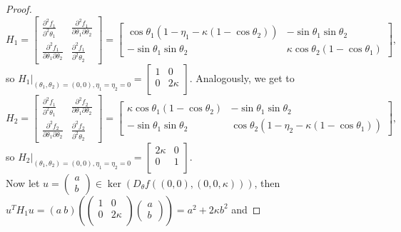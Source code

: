 \documentclass{article}
\theoremstyle{definition}
\begin{document}
\begin{refsection}
\begin{proof}
 $$
 H_1 = \begin{bmatrix}
\frac{\partial^2 f_1}{\partial^2 \theta_1} & \frac{\partial^2 f_1}{\partial \theta_1 \partial \theta_2}
\\ \frac{\partial^2 f_1}{\partial \theta_1 \partial \theta_2} & \frac{\partial^2 f_1}{\partial^2 \theta_2} 
 \end{bmatrix}
 =
\begin{bmatrix}
\cos\theta_1(1-\eta_1-\kappa(1-\cos\theta_2)) &  -\sin\theta_1\sin\theta_2 \\
 -\sin\theta_1\sin\theta_2 &\kappa\cos\theta_2(1-\cos\theta_1) 
 \end{bmatrix},$$ so $H_1|_{(\theta_1,\theta_2)=(0,0),\eta_1=\eta_2=0}=
 \begin{bmatrix}
     1 & 0 \\ 0 & 2\kappa \\
 \end{bmatrix}.$
 Analogously, we get to
 $$
 H_2 = \begin{bmatrix}
\frac{\partial^2 f_1}{\partial^2 \theta_1} & \frac{\partial^2 f_2}{\partial \theta_1 \partial \theta_2}
\\ \frac{\partial^2 f_2}{\partial \theta_1 \partial \theta_2} & \frac{\partial^2 f_2}{\partial^2 \theta_2} 
 \end{bmatrix}
 =
\begin{bmatrix}
\kappa\cos\theta_1(1-\cos\theta_2) &  -\sin\theta_1\sin\theta_2 \\
 -\sin\theta_1\sin\theta_2 &\cos\theta_2(1-\eta_2-\kappa(1-\cos\theta_1)) 
 \end{bmatrix},$$ so $H_2|_{(\theta_1,\theta_2)=(0,0),\eta_1=\eta_2=0} =
 \begin{bmatrix}
     2\kappa & 0 \\ 0 & 1 \\
 \end{bmatrix}.$ 
\\ Now let $u = \begin{pmatrix}a\\b \end{pmatrix}\in \ker(D_{\theta} f((0,0),(0,0,\kappa)))$, then $u^TH_1u=(a\ b)\left(\begin{pmatrix}
     1 & 0 \\ 0 & 2\kappa \\
 \end{pmatrix}\begin{pmatrix}
     a\\b
 \end{pmatrix}\right)=a^2+2\kappa b^2$ and

\end{proof}
\end{refsection}
\end{document}
